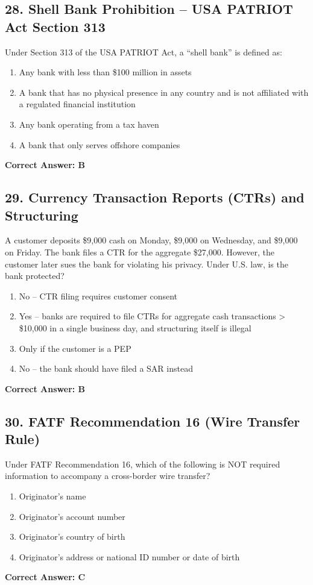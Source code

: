 \documentclass[11pt,a4paper]{article}
\begin{document}
	\subsection{28. Shell Bank Prohibition – USA PATRIOT Act Section 313}
	Under Section 313 of the USA PATRIOT Act, a “shell bank” is defined as:
	\begin{enumerate}[label=\Alph*.]
		\item Any bank with less than \$100 million in assets
		\item A bank that has no physical presence in any country and is not affiliated with a regulated financial institution
		\item Any bank operating from a tax haven
		\item A bank that only serves offshore companies
	\end{enumerate}
	\textbf{Correct Answer: B}
	
	\subsection{29. Currency Transaction Reports (CTRs) and Structuring}
	A customer deposits \$9,000 cash on Monday, \$9,000 on Wednesday, and \$9,000 on Friday. The bank files a CTR for the aggregate \$27,000. However, the customer later sues the bank for violating his privacy. Under U.S. law, is the bank protected?
	\begin{enumerate}[label=\Alph*.]
		\item No – CTR filing requires customer consent
		\item Yes – banks are required to file CTRs for aggregate cash transactions > \$10,000 in a single business day, and structuring itself is illegal
		\item Only if the customer is a PEP
		\item No – the bank should have filed a SAR instead
	\end{enumerate}
	\textbf{Correct Answer: B}
	
	\subsection{30. FATF Recommendation 16 (Wire Transfer Rule)}
	Under FATF Recommendation 16, which of the following is NOT required information to accompany a cross-border wire transfer?
	\begin{enumerate}[label=\Alph*.]
		\item Originator’s name
		\item Originator’s account number
		\item Originator’s country of birth
		\item Originator’s address or national ID number or date of birth
	\end{enumerate}
	\textbf{Correct Answer: C}
	
\end{document}
